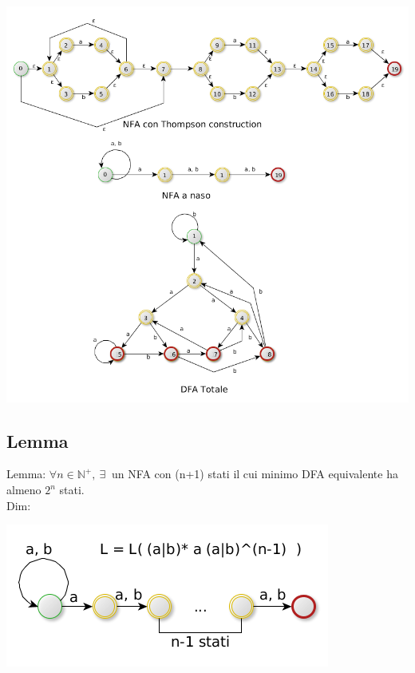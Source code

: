 \begin{center}
	\includegraphics[scale=0.5]{Chapters/Img/c02_09.png}\\
\end{center} 

\subsection{Lemma}
Lemma: $\forall n \in \mathbb{N}^+,\ \exists\ $ un NFA con (n+1) stati il cui minimo DFA equivalente ha almeno $2^n$ stati.\\

Dim: 
\begin{center}
	\includegraphics[scale=0.5]{Chapters/Img/c02_10.png}\\
\end{center} 


